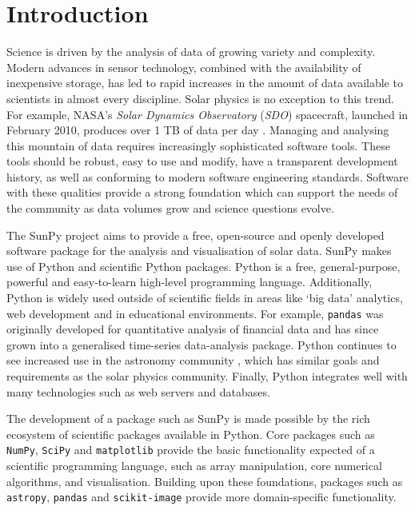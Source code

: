 \section{Introduction}\label{sec:Intro}

Science is driven by the analysis of data of growing variety and complexity.
Modern advances in sensor technology, combined with the availability of inexpensive 
storage, has led to rapid increases in the amount of data available to scientists in almost
every discipline.  Solar physics is no exception to this trend. For example,
NASA's \textit{Solar Dynamics Observatory} (\textit{SDO}) spacecraft, launched
in February 2010, produces over 1 TB of data per day \citep{aia}. Managing and
analysing this mountain of data requires increasingly sophisticated software
tools. These tools should be robust, easy to use and modify, have a transparent
development history, as well as conforming to modern software engineering
standards. Software with these qualities provide a strong foundation which can support the
needs of the community as data volumes grow and science questions evolve.

The SunPy project aims to provide a free, open-source and openly developed
software package for the analysis and visualisation of solar data. SunPy makes
use of Python and scientific Python packages. Python is a free, general-purpose, 
powerful and easy-to-learn high-level programming language. Additionally, Python is 
widely used outside of scientific fields in areas like `big data' analytics, web 
development and in educational environments. For example, \texttt{pandas} was 
originally developed for quantitative analysis of financial data and has since 
grown into a generalised time-series data-analysis package. Python continues to 
see increased use in the astronomy community \citep{greenfield2011}, which has 
similar goals and requirements as the solar physics community. Finally, Python 
integrates well with many technologies such as web servers \citep{dolgert2008} and databases. 

The development of a package such as SunPy is made possible by the rich ecosystem of 
scientific packages available in Python. Core packages such as \texttt{NumPy}, 
\texttt{SciPy} and \texttt{matplotlib} provide the basic functionality expected of a 
scientific programming language,
such as array manipulation, core numerical algorithms, and visualisation.
Building upon these foundations, packages such as \texttt{astropy}, \texttt{pandas} and
\texttt{scikit-image} provide more domain-specific functionality.

